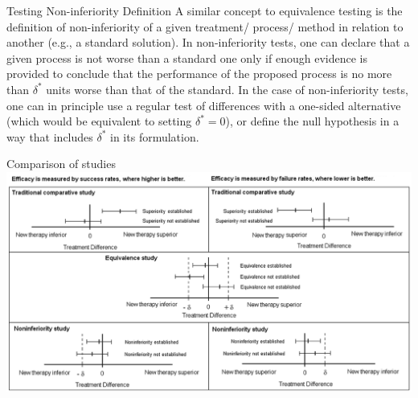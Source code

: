 \documentclass[t]{beamer}
\begin{document}

\begin{ftst}
{Testing Non-inferiority}
{Definition}
A similar concept to equivalence testing is the definition of non-inferiority of a given treatment/ process/ method in relation to another (e.g., a standard solution).
\vone
In non-inferiority tests, one can declare that a given process is not worse than a standard one only if enough evidence is provided to conclude that the performance of the proposed process is no more than $\delta^*$ units worse than that of the standard.
\vone
In the case of non-inferiority tests, one can in principle use a regular test of differences with a one-sided alternative (which would be equivalent to setting $\delta^* = 0$), or define the null hypothesis in a way that includes $\delta^*$ in its formulation.
\end{ftst}


\begin{ftst}
{Comparison of studies}
{\ }
\includegraphics[width=\textwidth]{../figs/TOST.png}
\end{ftst}

\end{document}
